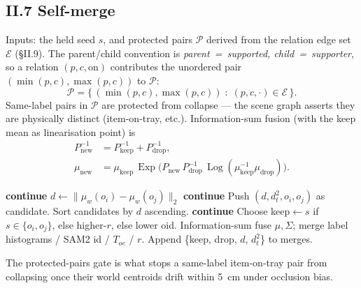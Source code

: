 \documentclass[11pt]{article}
\DeclareMathOperator{\Exp}{Exp}
\DeclareMathOperator{\Log}{Log}
\begin{document}
\subsection*{II.7 Self-merge}

Inputs: the held seed $s$, and protected pairs $\mathcal P$ derived from the
relation edge set $\mathcal E$ (\S II.9). The parent/child convention is
\emph{parent~=~supported, child~=~supporter}, so a relation $(p,c,\text{on})$
contributes the unordered pair $(\min(p,c),\max(p,c))$ to $\mathcal P$:
\begin{equation*}
\mathcal{P} = \bigl\{\,(\min(p,c),\max(p,c))\;:\;(p,c,\cdot)\in\mathcal{E}\,\bigr\}.
\end{equation*}
Same-label pairs in $\mathcal P$ are protected from collapse --- the scene
graph asserts they are physically distinct (item-on-tray, etc.).
Information-sum fusion (with the keep mean as linearisation point) is
\begin{equation}\label{eq:self_merge_info}
\begin{aligned}
P^{-1}_{\text{new}} &= P^{-1}_{\text{keep}} + P^{-1}_{\text{drop}}, \\
\mu_{\text{new}} &= \mu_{\text{keep}}\,\Exp\!\bigl(P_{\text{new}}\,P^{-1}_{\text{drop}}\,\Log(\mu_{\text{keep}}^{-1}\mu_{\text{drop}})\bigr).
\end{aligned}
\end{equation}

\begin{algorithm}[H]
\caption{Self-merge pass.}
\begin{algorithmic}[1]
   \textbf{continue} \EndIf
  \State $d \gets \|\mu_w(o_i) - \mu_w(o_j)\|_2$
   \textbf{continue} \EndIf
  \State Push $(d, d^2_t, o_i, o_j)$ as candidate.
\EndFor
\State Sort candidates by $d$ ascending.
   \textbf{continue} \EndIf
  \State Choose keep$\gets s$ if $s\in\{o_i,o_j\}$, else higher-$r$, else lower oid.
  \State Information-sum fuse $\mu, \Sigma$; merge label histograms / SAM2 id / $T_{oe}$ / $r$.
  \State Append \{keep, drop, $d$, $d^2_t$\} to merges.
\EndFor
\end{algorithmic}
\end{algorithm}
The protected-pairs gate is what stops a same-label item-on-tray pair from
collapsing once their world centroids drift within 5~cm under occlusion
bias.
\end{document}
